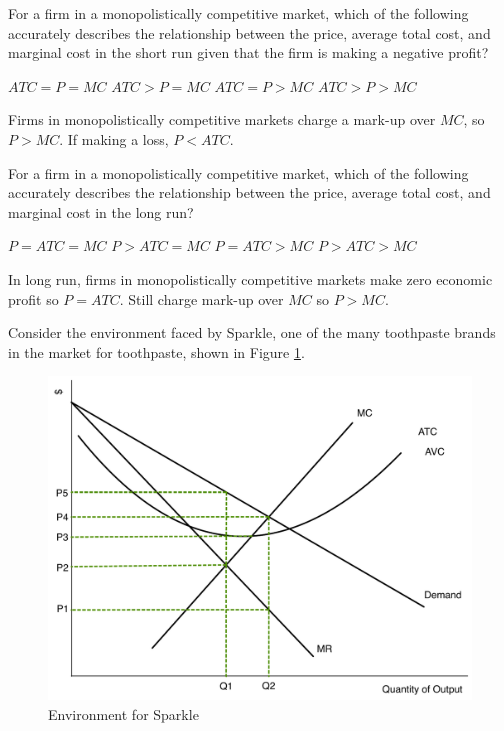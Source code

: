 \documentclass[addpoints,11pt]{exam}
\theoremstyle{definition}
\begin{document}
\begin{questions}
	\question For a firm in a monopolistically competitive market, which of the following accurately describes the relationship between the price, average total cost, and marginal cost in the short run given that the firm is making a negative profit?
	
	\begin{choices}
		\choice $ATC = P = MC$
		\choice $ATC > P = MC$
		\choice $ATC = P > MC$
		\CorrectChoice $ATC > P > MC$
	\end{choices}
	
	\begin{solution}
		Firms in monopolistically competitive markets charge a mark-up over $MC$, so $P>MC$. If making a loss, $P<ATC$.
	\end{solution}
	
\newpage
	
	\question For a firm in a monopolistically competitive market, which of the following accurately describes the relationship between the price, average total cost, and marginal cost in the long run?
	
	\begin{choices}
		\choice $P = ATC = MC$
		\choice $P > ATC = MC$
		\CorrectChoice $P = ATC > MC$
		\choice $P > ATC > MC$
	\end{choices}
	
	\begin{solution}
		In long run, firms in monopolistically competitive markets make zero economic profit so $P=ATC$. Still charge mark-up over $MC$ so $P>MC$.
	\end{solution}
	
	\question Consider the environment faced by Sparkle, one of the many toothpaste brands in the market for toothpaste, shown in Figure \ref{fig1}.
	
	\begin{figure}[ht!]
		\centering
		\includegraphics[scale=.40]{hw5_plot1.pdf}
		\caption{Environment for Sparkle}
		\label{fig1}
	\end{figure}
	

\end{questions}
\end{document}
